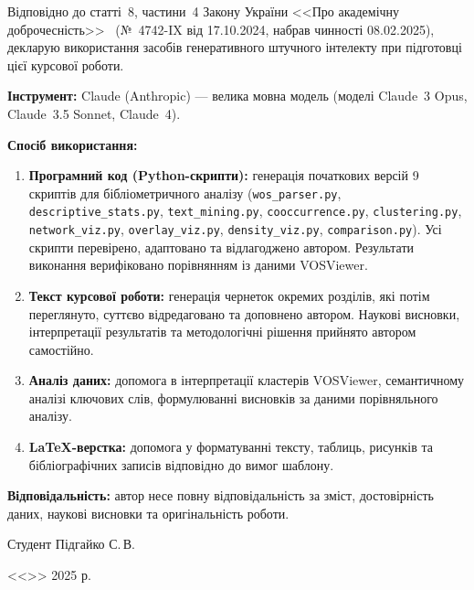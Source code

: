 Відповідно до статті~8, частини~4 Закону України <<Про академічну доброчесність>>~\cite{AkademichnaDobrochesnist2024} (№~4742-IX від 17.10.2024, набрав чинності 08.02.2025), декларую використання засобів генеративного штучного інтелекту при підготовці цієї курсової роботи.

\textbf{Інструмент:} Claude (Anthropic) --- велика мовна модель (моделі Claude~3 Opus, Claude~3.5 Sonnet, Claude~4).

\textbf{Спосіб використання:}

\begin{enumerate}
    \item \textbf{Програмний код (Python-скрипти):} генерація початкових версій 9 скриптів для бібліометричного аналізу (\texttt{wos\_parser.py}, \texttt{descriptive\_stats.py}, \texttt{text\_mining.py}, \texttt{cooccurrence.py}, \texttt{clustering.py}, \texttt{network\_viz.py}, \texttt{overlay\_viz.py}, \texttt{density\_viz.py}, \texttt{comparison.py}). Усі скрипти перевірено, адаптовано та відлагоджено автором. Результати виконання верифіковано порівнянням із даними VOSViewer.

    \item \textbf{Текст курсової роботи:} генерація чернеток окремих розділів, які потім переглянуто, суттєво відредаговано та доповнено автором. Наукові висновки, інтерпретації результатів та методологічні рішення прийнято автором самостійно.

    \item \textbf{Аналіз даних:} допомога в інтерпретації кластерів VOSViewer, семантичному аналізі ключових слів, формулюванні висновків за даними порівняльного аналізу.

    \item \textbf{LaTeX-верстка:} допомога у форматуванні тексту, таблиць, рисунків та бібліографічних записів відповідно до вимог шаблону.
\end{enumerate}

\textbf{Відповідальність:} автор несе повну відповідальність за зміст, достовірність даних, наукові висновки та оригінальність роботи.

\vspace{1cm}

\noindent Студент \hfill Підгайко С.\,В.

\noindent <<\hrf{1cm}>> \hrf{3cm} 2025 р.

